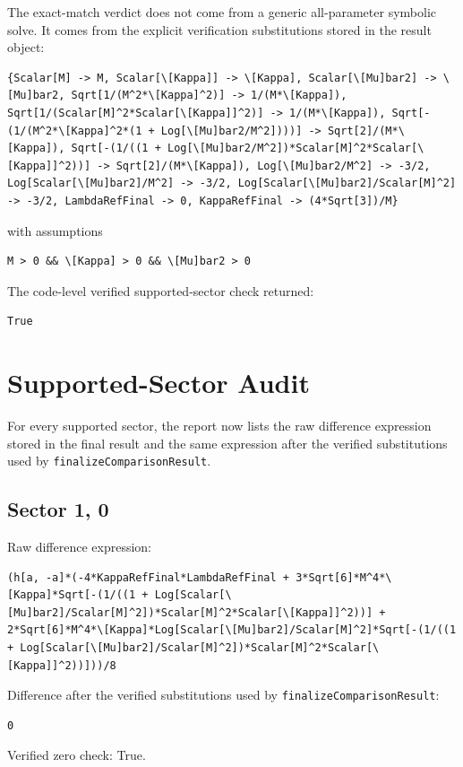 \documentclass[11pt]{article}
\begin{document}
The exact-match verdict does not come from a generic all-parameter symbolic solve. It comes from the explicit verification substitutions stored in the result object:

\begin{verbatim}
{Scalar[M] -> M, Scalar[\[Kappa]] -> \[Kappa], Scalar[\[Mu]bar2] -> \[Mu]bar2, Sqrt[1/(M^2*\[Kappa]^2)] -> 1/(M*\[Kappa]), Sqrt[1/(Scalar[M]^2*Scalar[\[Kappa]]^2)] -> 1/(M*\[Kappa]), Sqrt[-(1/(M^2*\[Kappa]^2*(1 + Log[\[Mu]bar2/M^2])))] -> Sqrt[2]/(M*\[Kappa]), Sqrt[-(1/((1 + Log[\[Mu]bar2/M^2])*Scalar[M]^2*Scalar[\[Kappa]]^2))] -> Sqrt[2]/(M*\[Kappa]), Log[\[Mu]bar2/M^2] -> -3/2, Log[Scalar[\[Mu]bar2]/M^2] -> -3/2, Log[Scalar[\[Mu]bar2]/Scalar[M]^2] -> -3/2, LambdaRefFinal -> 0, KappaRefFinal -> (4*Sqrt[3])/M}
\end{verbatim}

with assumptions

\begin{verbatim}
M > 0 && \[Kappa] > 0 && \[Mu]bar2 > 0
\end{verbatim}

The code-level verified supported-sector check returned:

\begin{verbatim}
True
\end{verbatim}

\section{Supported-Sector Audit}

For every supported sector, the report now lists the raw difference expression stored in the final result and the same expression after the verified substitutions used by \texttt{finalizeComparisonResult}.

\subsection*{Sector {1, 0}}
Raw difference expression:
\begin{verbatim}
(h[a, -a]*(-4*KappaRefFinal*LambdaRefFinal + 3*Sqrt[6]*M^4*\[Kappa]*Sqrt[-(1/((1 + Log[Scalar[\[Mu]bar2]/Scalar[M]^2])*Scalar[M]^2*Scalar[\[Kappa]]^2))] + 2*Sqrt[6]*M^4*\[Kappa]*Log[Scalar[\[Mu]bar2]/Scalar[M]^2]*Sqrt[-(1/((1 + Log[Scalar[\[Mu]bar2]/Scalar[M]^2])*Scalar[M]^2*Scalar[\[Kappa]]^2))]))/8
\end{verbatim}
Difference after the verified substitutions used by \texttt{finalizeComparisonResult}:
\begin{verbatim}
0
\end{verbatim}
Verified zero check: True.
\end{document}

